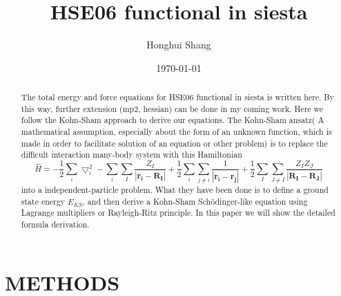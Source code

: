 \documentclass[aps,preprint,12pt]{revtex4-1}
\begin{document}
\title{HSE06 functional in siesta}
\author{ Honghui Shang}


\date{\today}

\begin{abstract}
The total energy and force equations for HSE06 functional in siesta is written here. By this way, further
 extension (mp2, hessian) can be done in my coming work. Here we follow the Kohn-Sham approach \cite{DFT_KS} to
derive our equations.  The Kohn-Sham ansatz( A mathematical assumption, especially about the form of an 
unknown function, which is made in order to facilitate solution of an equation or other problem) is to replace the difficult interaction many-body system with this Hamiltonian 
\begin{equation}
\hat{H}=-\dfrac{1}{2}\sum_{i}\bigtriangledown^2_{i}-\sum_{i}\sum_{I}\dfrac{Z_I}{|\mathbf{r_i}-\mathbf{R_I}|}
+\dfrac{1}{2}\sum_{i}\sum_{j\neq i}\dfrac{1}{|\mathbf{r_i}-\mathbf{r_j}|}
+\dfrac{1}{2}\sum_{I}\sum_{J\neq I}\dfrac{Z_I Z_J}{|\mathbf{R_I}-\mathbf{R_J}|}
\end{equation} into a independent-particle problem. What they have been done is to define a ground state
energy $E_{KS}$, and then derive a Kohn-Sham Sch\"{o}dinger-like equation using Lagrange multipliers or
Rayleigh-Ritz principle.  In this paper we will show the detailed formula derivation.

\end{abstract}
\maketitle


\section{METHODS}
\end{document}
